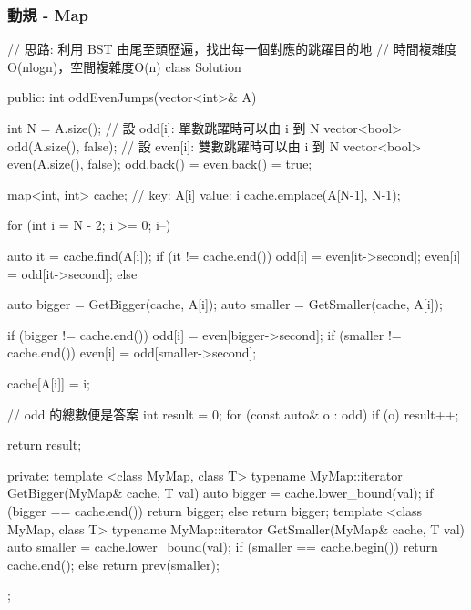 \subsubsection{動規 - Map}
\begin{Code}
// 思路: 利用 BST 由尾至頭歷遍，找出每一個對應的跳躍目的地
// 時間複雜度O(nlogn)，空間複雜度O(n)
class Solution {
public:
    int oddEvenJumps(vector<int>& A) {
        int N = A.size();
        // 設 odd[i]: 單數跳躍時可以由 i 到 N
        vector<bool> odd(A.size(), false);
        // 設 even[i]: 雙數跳躍時可以由 i 到 N
        vector<bool> even(A.size(), false);
        odd.back() = even.back() = true;

        map<int, int> cache; // key: A[i] value: i
        cache.emplace(A[N-1], N-1);

        for (int i = N - 2; i >= 0; i--)
        {
            auto it = cache.find(A[i]);
            if (it != cache.end())
            {
                odd[i] = even[it->second];
                even[i] = odd[it->second];
            }
            else
            {
                auto bigger = GetBigger(cache, A[i]);
                auto smaller = GetSmaller(cache, A[i]);

                if (bigger != cache.end())
                    odd[i] = even[bigger->second];
                if (smaller != cache.end())
                    even[i] = odd[smaller->second];
            }
            cache[A[i]] = i;
        }

        // odd 的總數便是答案
        int result = 0;
        for (const auto& o : odd)
            if (o) result++;

        return result;
    }
private:
    template <class MyMap, class T>
        typename MyMap::iterator GetBigger(MyMap& cache, T val)
    {
        auto bigger = cache.lower_bound(val);
        if (bigger == cache.end())
            return bigger;
        else
            return bigger;
    }
    template <class MyMap, class T>
        typename MyMap::iterator GetSmaller(MyMap& cache, T val)
    {
        auto smaller = cache.lower_bound(val);
        if (smaller == cache.begin())
            return cache.end();
        else
            return prev(smaller);
    }
};
\end{Code}

